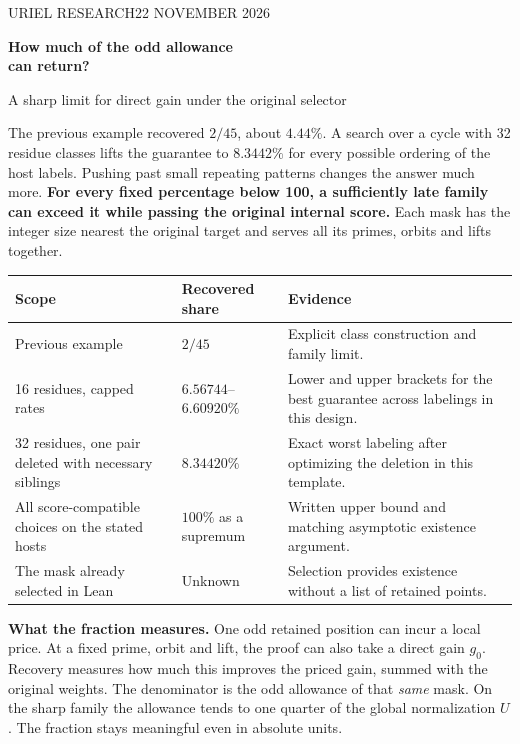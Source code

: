 \documentclass[12pt,letterpaper]{article}
\newcommand{\para}[1]{\par\medskip\noindent\textbf{#1}\quad}
\begin{document}
\thispagestyle{plain}
{\sffamily\small\color{accent}URIEL RESEARCH\hfill 22 NOVEMBER 2026}\par\vspace{12pt}
{\Huge\bfseries\color{ink}How much of the odd allowance\\can return?\par}\vspace{6pt}
{\Large\color{muted}A sharp limit for direct gain under the original selector}\par\bigskip

The previous example recovered \(2/45\), about \(4.44\%\). A search over a cycle with 32 residue classes lifts the guarantee to \(8.3442\%\) for every possible ordering of the host labels. Pushing past small repeating patterns changes the answer much more. \textbf{For every fixed percentage below 100, a sufficiently late family can exceed it while passing the original internal score.} Each mask has the integer size nearest the original target and serves all its primes, orbits and lifts together.

\begin{center}\begin{tabularx}{\linewidth}{@{}p{.30\linewidth}p{.23\linewidth}Y@{}}\toprule
Scope & Recovered share & Evidence\\\midrule
Previous example & \(2/45\) & Explicit class construction and family limit.\\
16 residues, capped rates & \(6.56744\)--\(6.60920\%\) & Lower and upper brackets for the best guarantee across labelings in this design.\\
32 residues, one pair deleted with necessary siblings & \(8.34420\%\) & Exact worst labeling after optimizing the deletion in this template.\\
All score-compatible choices on the stated hosts & \(100\%\) as a supremum & Written upper bound and matching asymptotic existence argument.\\
The mask already selected in Lean & Unknown & Selection provides existence without a list of retained points.\\\bottomrule
\end{tabularx}\end{center}

\para{What the fraction measures.} One odd retained position can incur a local price. At a fixed prime, orbit and lift, the proof can also take a direct gain \(g_0\). Recovery measures how much this improves the priced gain, summed with the original weights. The denominator is the odd allowance of that \emph{same} mask. On the sharp family the allowance tends to one quarter of the global normalization \(U\). The fraction stays meaningful even in absolute units.
\end{document}
